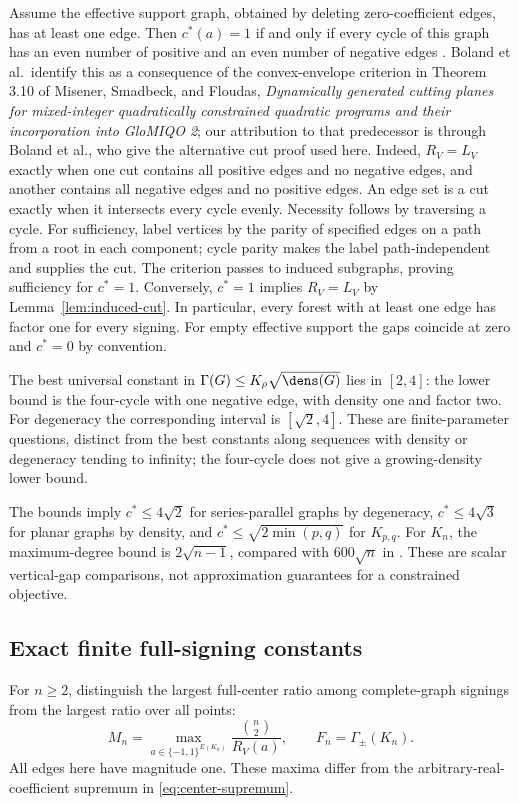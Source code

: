 Assume the effective support graph, obtained by deleting zero-coefficient
edges, has at least one edge. Then $c^*(a)=1$ if and only if every cycle
of this graph
has an even number of positive and an even number of negative edges
\citep[Theorem 4]{Boland2017}. Boland et al.\ identify this as a consequence
of the convex-envelope criterion in Theorem 3.10 of Misener, Smadbeck,
and Floudas, \emph{Dynamically generated cutting planes for mixed-integer
quadratically constrained quadratic programs and their incorporation into
GloMIQO 2}; our attribution to that predecessor is through Boland et al.,
who give the alternative cut proof used here.
Indeed, $R_V=L_V$ exactly when one cut
contains all positive edges and no negative edges, and another contains
all negative edges and no positive edges. An edge set is a cut exactly
when it intersects every cycle evenly. Necessity follows by traversing a
cycle. For sufficiency, label vertices by the parity of specified edges
on a path from a root in each component; cycle parity makes the label
path-independent and supplies the cut. The criterion passes to induced
subgraphs, proving sufficiency for $c^*=1$. Conversely, $c^*=1$ implies
$R_V=L_V$ by Lemma~\ref{lem:induced-cut}. In particular, every forest with
at least one edge has factor one for every signing. For empty effective
support the gaps coincide at zero and $c^*=0$ by convention.

The best universal constant in $\Gamma(G)\le K_\rho\sqrt{\dens(G)}$
lies in $[2,4]$: the lower bound is the four-cycle with one negative edge,
with density one and factor two. For degeneracy the corresponding interval
is $[\sqrt2,4]$. These are finite-parameter questions, distinct from the
best constants along sequences with density or degeneracy tending to
infinity; the four-cycle does not give a growing-density lower bound.

The bounds imply $c^*\le4\sqrt2$ for series-parallel graphs by degeneracy,
$c^*\le4\sqrt3$ for planar graphs by density, and
$c^*\le\sqrt{2\min(p,q)}$ for $K_{p,q}$. For $K_n$, the maximum-degree
bound is $2\sqrt{n-1}$, compared with $600\sqrt n$ in
\citet[Theorem 2]{Boland2017}. These are scalar vertical-gap comparisons,
not approximation guarantees for a constrained objective.

\subsection{Exact finite full-signing constants}\label{subsec:finite-signings}
For $n\ge2$, distinguish the largest full-center ratio among complete-graph
signings from the largest ratio over all points:
\[
 M_n=\max_{a\in\{-1,1\}^{E(K_n)}}\frac{\binom n2}{R_V(a)},
 \qquad F_n=\Gamma_\pm(K_n).
\]
All edges here have magnitude one. These maxima differ from the
arbitrary-real-coefficient supremum in \eqref{eq:center-supremum}.


